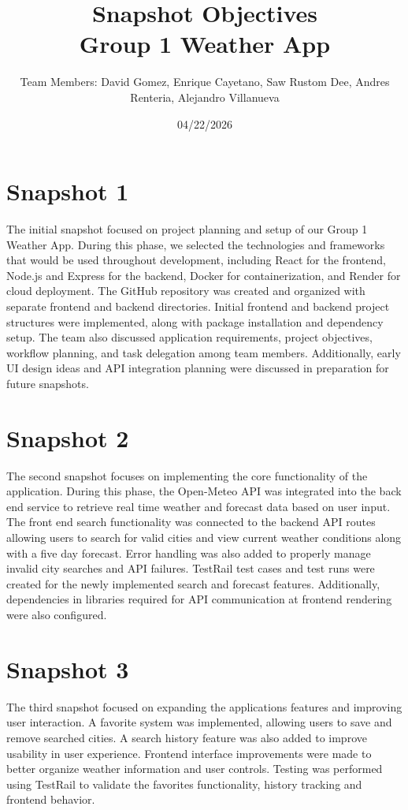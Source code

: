 \documentclass[12pt]{article}
\title{Snapshot Objectives\\Group 1 Weather App}
\author{Team Members: David Gomez, Enrique Cayetano, Saw Rustom Dee, Andres Renteria, Alejandro Villanueva}
\date{04/22/2026}
\begin{document}
\maketitle

\tableofcontents

\newpage

\section{Snapshot 1}
The initial snapshot focused on project planning and setup of our Group 1 Weather App.
During this phase, we selected the technologies and frameworks that would be used throughout development, including React for the frontend, Node.js and Express for the backend, Docker for containerization, and Render for cloud deployment. 
The GitHub repository was created and organized with separate frontend and backend directories. Initial frontend and backend project structures were implemented, along with package installation and dependency setup. The team also discussed application requirements, project objectives, workflow planning, and task delegation among team members.
Additionally, early UI design ideas and API integration planning were discussed in preparation for future snapshots.

\section{Snapshot 2}
The second snapshot focuses on implementing the core functionality of the application. During this phase, the Open-Meteo API was integrated into the back end service to retrieve real time weather and forecast data based on user input.
The front end search functionality was connected to the backend API routes allowing users to search for valid cities and view current weather conditions along with a five day forecast. Error handling was also added to properly manage invalid city searches and API failures. 
TestRail test cases and test runs were created for the newly implemented search and forecast features. Additionally, dependencies in libraries required for API communication at frontend rendering were also configured.

\section{Snapshot 3}
The third snapshot focused on expanding the applications features and improving user interaction. A favorite system was implemented, allowing users to save and remove searched cities.
A search history feature was also added to improve usability in user experience. Frontend interface improvements were made to better organize weather information and user controls. 
Testing was performed using TestRail to validate the favorites functionality, history tracking and frontend behavior.
\end{document}
